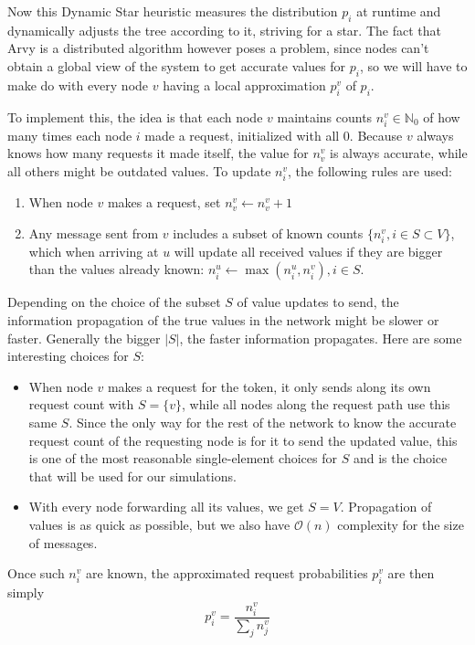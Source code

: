 \documentclass[a4paper, oneside]{discothesis}
\begin{document}
Now this Dynamic Star heuristic measures the distribution $p_i$ at runtime and dynamically adjusts the tree according to it, striving for a star. The fact that Arvy is a distributed algorithm however poses a problem, since nodes can't obtain a global view of the system to get accurate values for $p_i$, so we will have to make do with every node $v$ having a local approximation $p_i^v$ of $p_i$.

To implement this, the idea is that each node $v$ maintains counts $n_i^v\in\mathbb{N}_0$ of how many times each node $i$ made a request, initialized with all $0$. Because $v$ always knows how many requests it made itself, the value for $n_v^v$ is always accurate, while all others might be outdated values. To update $n_i^v$, the following rules are used:

\newpage
\begin{enumerate}
\item When node $v$ makes a request, set $n_v^v\gets n_v^v+1$
\label{rule1}
\item Any message sent from $v$ includes a subset of known counts $\{n_i^v,i\in S\subset V\}$, which when arriving at $u$ will update all received values if they are bigger than the values already known: $n_i^u\gets \max(n_i^u,n_i^v),i\in S$.
\end{enumerate}

Depending on the choice of the subset $S$ of value updates to send, the information propagation of the true values in the network might be slower or faster. Generally the bigger $|S|$, the faster information propagates. Here are some interesting choices for $S$:
\begin{itemize}
\item When node $v$ makes a request for the token, it only sends along its own request count with $S=\{v\}$, while all nodes along the request path use this same $S$. Since the only way for the rest of the network to know the accurate request count of the requesting node is for it to send the updated value, this is one of the most reasonable single-element choices for $S$ and is the choice that will be used for our simulations.
\item With every node forwarding all its values, we get $S=V$. Propagation of values is as quick as possible, but we also have $\mathcal{O}(n)$ complexity for the size of messages.
\end{itemize}

Once such $n_i^v$ are known, the approximated request probabilities $p_i^v$ are then simply
\begin{equation}
p_i^v=\frac{n_i^v}{\sum_jn_j^v}
\end{equation}
\end{document}
